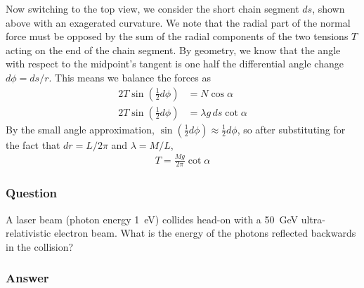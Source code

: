 Now switching to the top view, we consider the short chain segment $ds$, shown
above with an exagerated curvature. We note that the radial part of the
normal force must be opposed by the sum of the radial components of the two
tensions $T$ acting on the end of the chain segment. By geometry, we know that
the angle with respect to the midpoint's tangent is one half the differential
angle change $d\phi  = ds/r$. This means we balance the forces as
\begin{align*}
    2T\sin(\frac 12 d\phi ) &= N \cos {\alpha} \\
    2T\sin(\frac 12 d\phi ) &= {\lambda} g\,ds \cot {\alpha}
\end{align*}
By the small angle approximation, $\sin (\frac 12 d\phi ) \approx \frac 12 d\phi $, so after
substituting for the fact that $dr = L/2{\pi} $ and ${\lambda} = M/L$,
\begin{align}
    \boxed{
    T = \frac{Mg}{2{\pi} } \cot {\alpha}
    }
\end{align}

\subsubsection{Question}

A laser beam (photon energy \SI{1}{\eV}) collides head-on with a \SI{50}{\GeV}
ultra-relativistic electron beam. What is the energy of the photons reflected
backwards in the collision?

\subsubsection{Answer}


